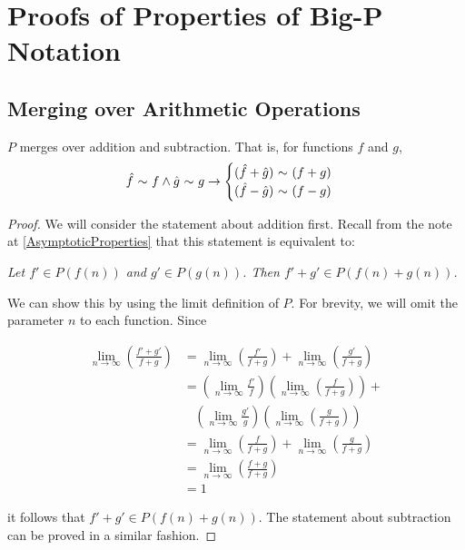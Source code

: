 \appendix
\appendixpage

\section{Proofs of Properties of Big-P Notation}

\subsection{Merging over Arithmetic Operations}
\label{MergingOverArithmetic}

\begin{theorem}
	$P$ merges over addition and subtraction. That is, for functions $f$ and $g$,
	\begin{align*}
	\hat{f} \ \mathtt{\sim}\  f \land \hat{g} \ \mathtt{\sim}\  g \rightarrow \begin{cases}
	(\hat{f} + \hat{g}) \ \mathtt{\sim}\  (f + g)\\
	(\hat{f} - \hat{g}) \ \mathtt{\sim}\  (f - g)
	\end{cases}
	\end{align*}
\end{theorem}

\begin{proof}
	We will consider the statement about addition first. Recall from the note at \ref{AsymptoticProperties} that this statement is equivalent to:
	
	\textit{Let $f' \in P(f(n))$ and $g' \in P(g(n))$. Then $f' + g' \in P(f(n) + g(n))$.}
	
	We can show this by using the limit definition of $P$. For brevity, we will omit the parameter $n$ to each function. Since
	
	\begin{align*}
	\lim_{n \to \infty} \left( \frac{f' + g'}{f + g} \right) &= \lim_{n \to \infty} \left( \frac{f'}{f + g} \right) + \lim_{n \to \infty} \left( \frac{g'}{f + g} \right)\\
	&= \left( \lim_{n \to \infty} \frac{f'}{f} \right) \left( \lim_{n \to \infty} \left( \frac{f}{f + g} \right) \right) +\\
	&\ \ \ \ \left( \lim_{n \to \infty} \frac{g'}{g} \right) \left( \lim_{n \to \infty} \left( \frac{g}{f + g} \right) \right)\\
	&= \lim_{n \to \infty} \left( \frac{f}{f + g} \right) + \lim_{n \to \infty} \left( \frac{g}{f + g} \right)\\
	&= \lim_{n \to \infty} \left( \frac{f + g}{f + g} \right)\\
	&= 1
	\end{align*}
	
	it follows that $f' + g' \in P(f(n) + g(n))$. The statement about subtraction can be proved in a similar fashion.
\end{proof}

